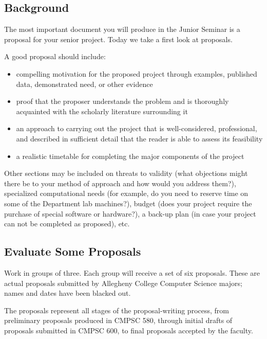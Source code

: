 
\usepackage[compact]{titlesec}




\subsection*{Background}
The most important document you will produce in the Junior Seminar is a
proposal for your senior project. Today we take a first look at proposals.

A good proposal should include:
\begin{itemize}
\item
compelling motivation for the proposed project
through examples, published data, demonstrated need, or other evidence
\item
proof that the proposer understands the problem and is 
thoroughly acquainted
with the scholarly literature surrounding it
\item
an approach to carrying out the project that is well-considered, 
professional, and described in sufficient detail that the reader is able to
assess its feasibility
\item
a realistic timetable for
completing the major components of the project
\end{itemize}
Other sections may be included on
threats to validity (what objections might there be
to your method of approach and how would you address them?), 
specialized computational needs (for example, do you need to reserve
time on some of the Department lab machines?), budget (does your project
require the purchase of special software or hardware?), a back-up plan (in
case your project can not be completed as proposed), etc.

\subsection*{Evaluate Some Proposals}
Work in groups of three. Each group will receive a set of six proposals. 
These are actual proposals submitted by Allegheny College Computer 
Science majors; names and dates have been blacked out.

The proposals represent all stages of the proposal-writing process,
from preliminary proposals produced in CMPSC 580, through initial drafts
of proposals submitted in CMPSC 600, to final proposals accepted by
the faculty. 

